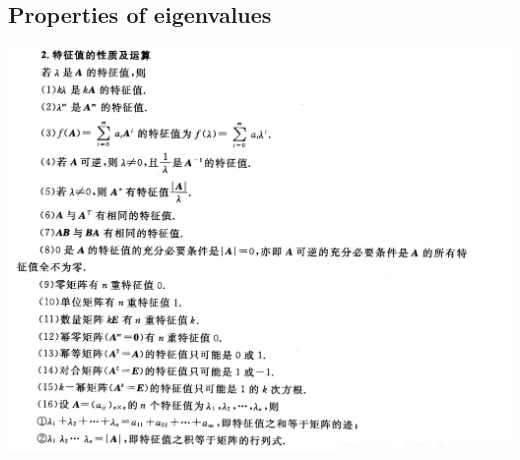 \documentclass{article}
\begin{document}
\subsection*{Properties of eigenvalues}
\includegraphics[width=1.5\linewidth]{lec2-1.png}
\end{document}
